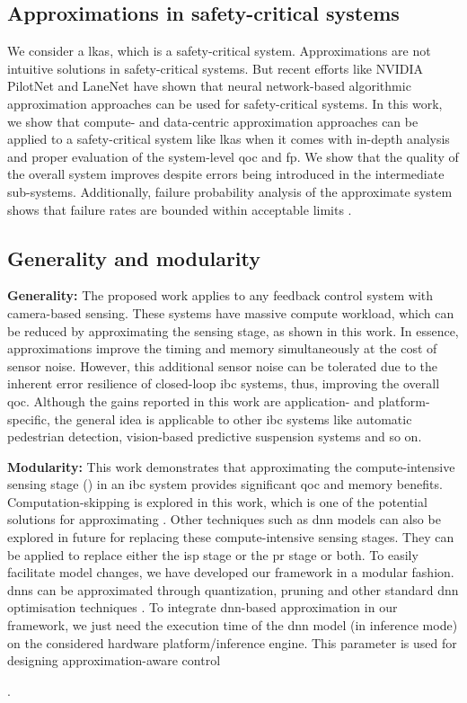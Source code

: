 \subsection{Approximations in safety-critical systems}
We consider a \gls{lkas}, which is a safety-critical system. Approximations are not intuitive solutions in safety-critical systems. But recent efforts like NVIDIA PilotNet \cite{bojarski2016end, bojarski2017explaining} and LaneNet \cite{lanenet} have shown that neural network-based algorithmic approximation approaches can be used for safety-critical systems. In this work, we show that compute- and data-centric approximation approaches can be applied to a safety-critical system like \gls{lkas} when it comes with in-depth analysis and proper evaluation of the system-level \gls{qoc} and \gls{fp}. We show that the quality of the overall system improves despite errors being introduced in the intermediate sub-systems. Additionally, failure probability analysis of the approximate system shows that failure rates are bounded within acceptable limits \cite{fault_tree}.       

\subsection{Generality and modularity}
{\par \noindent \textbf{Generality: } The proposed work applies to any feedback control system with camera-based sensing. These systems have massive compute workload, which can be reduced by approximating the sensing stage, as shown in this work. In essence, approximations improve the timing and memory simultaneously at the cost of sensor noise. However, this additional sensor noise can be tolerated due to the inherent error resilience of closed-loop \gls{ibc} systems, thus, improving the overall \gls{qoc}. Although the gains reported in this work are application- and platform-specific, the general idea is applicable to other \gls{ibc} systems \cite{bengler2014three} like automatic pedestrian detection, vision-based predictive suspension systems and so on. 

\par \noindent \textbf{Modularity: }This work demonstrates that approximating the compute-intensive sensing stage (\taskS) in an \gls{ibc} system provides significant \gls{qoc} and memory benefits. Computation-skipping is explored in this work, which is one of the potential solutions for approximating \taskS. Other techniques such as \gls{dnn} models can also be explored in future for replacing these compute-intensive sensing stages. They can be applied to replace either the \gls{isp} stage \cite{learning_isp} or the \gls{pr} stage \cite{lanenet} or both. To easily facilitate model changes, we have developed our framework in a modular fashion.  \glspl{dnn} can be approximated through quantization, pruning and other standard \gls{dnn} optimisation techniques \cite{mishra2020survey}. To integrate \gls{dnn}-based approximation in our framework, we just need the execution time of the \gls{dnn} model (in inference mode) on the considered hardware platform/inference engine. This parameter is used for designing approximation-aware control}.
